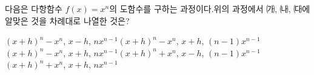 다음은 다항함수 $f(x)=x^n$의 도함수를 구하는 과정이다.\noindent 위의 과정에서 ㈎, ㈏, ㈐에 알맞은 것을 차례대로 나열한 것은?
\begin{choicesv}{$(x+h)^n-x^n$, $x-h$, $nx^{n-1}$}{$(x+h)^n-x^n$, $x+h$, $(n-1)x^{n-1}$}{$(x+h)^n-x^n$, $x+h$, $nx^{n-1}$}{$(x+h)^n+x^n$, $x-h$, $(n-1)x^{n-1}$}{$(x+h)^n+x^n$, $x+h$, $nx^{n-1}$}\end{choicesv}
